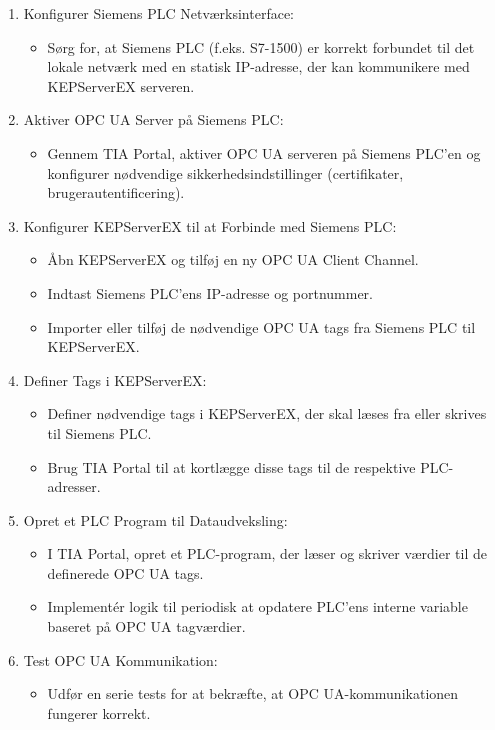 \begin{enumerate}
	\item Konfigurer Siemens PLC Netværksinterface:
	\begin{itemize}
		\item Sørg for, at Siemens PLC (f.eks. S7-1500) er korrekt forbundet til det lokale netværk med en statisk IP-adresse, der kan kommunikere med KEPServerEX serveren.
	\end{itemize}
	\item Aktiver OPC UA Server på Siemens PLC:
	\begin{itemize}
		\item Gennem TIA Portal, aktiver OPC UA serveren på Siemens PLC'en og konfigurer nødvendige sikkerhedsindstillinger (certifikater, brugerautentificering).
	\end{itemize}
	\item Konfigurer KEPServerEX til at Forbinde med Siemens PLC:
	\begin{itemize}
		\item Åbn KEPServerEX og tilføj en ny OPC UA Client Channel.
		\item Indtast Siemens PLC’ens IP-adresse og portnummer.
		\item Importer eller tilføj de nødvendige OPC UA tags fra Siemens PLC til KEPServerEX.
	\end{itemize}
	\item Definer Tags i KEPServerEX:
	\begin{itemize}
		\item Definer nødvendige tags i KEPServerEX, der skal læses fra eller skrives til Siemens PLC.
		\item Brug TIA Portal til at kortlægge disse tags til de respektive PLC-adresser.
	\end{itemize}
	\item Opret et PLC Program til Dataudveksling:
	\begin{itemize}
		\item I TIA Portal, opret et PLC-program, der læser og skriver værdier til de definerede OPC UA tags.
		\item Implementér logik til periodisk at opdatere PLC'ens interne variable baseret på OPC UA tagværdier.
	\end{itemize}
	\item Test OPC UA Kommunikation:
	\begin{itemize}
		\item Udfør en serie tests for at bekræfte, at OPC UA-kommunikationen fungerer korrekt.

\end{itemize}
\end{enumerate}
